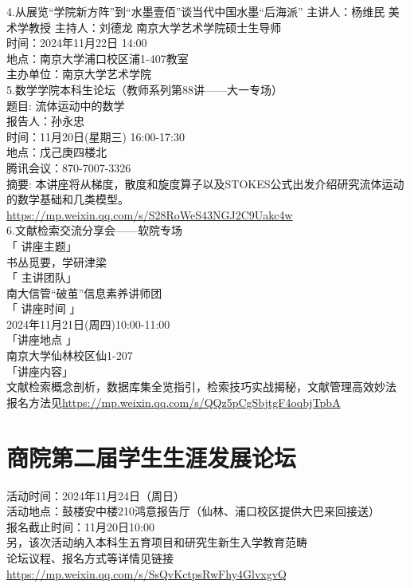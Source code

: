\documentclass[letterpaper, 12pt]{article}
\begin{document}
\begin{multicols}{2}
4.从展览“学院新方阵”到“水墨壹佰”谈当代中国水墨“后海派”
主讲人：杨维民 美术学教授 主持人：刘德龙 南京大学艺术学院硕士生导师\\
时间：2024年11月22日 14:00\\
地点：南京大学浦口校区浦1-407教室\\
主办单位：南京大学艺术学院\\

5.数学学院本科生论坛（教师系列第88讲——大一专场）\\
题目: 流体运动中的数学\\
报告人：孙永忠\\
时间：11月20日(星期三) 16:00-17:30\\
地点：戊己庚四楼北\\
腾讯会议：870-7007-3326\\
摘要: 本讲座将从梯度，散度和旋度算子以及STOKES公式出发介绍研究流体运动的数学基础和几类模型。\\
\url{https://mp.weixin.qq.com/s/S28RoWeS43NGJ2C9Uakc4w}\\

6.文献检索交流分享会——软院专场\\
「 讲座主题」\\
书丛觅要，学研津梁\\
「 主讲团队」\\
南大信管“破茧”信息素养讲师团\\
「 讲座时间 」\\
2024年11月21日(周四)10:00-11:00\\
「讲座地点 」\\
南京大学仙林校区仙1-207\\
「讲座内容」\\
文献检索概念剖析，数据库集全览指引，检索技巧实战揭秘，文献管理高效妙法\\
报名方法见\url{https://mp.weixin.qq.com/s/QQz5pCgSbjtgF4oqbjTpbA}\\
\section{商院第二届学生生涯发展论坛}
活动时间：2024年11月24日（周日）
\\活动地点：鼓楼安中楼210鸿意报告厅（仙林、浦口校区提供大巴来回接送）
\\报名截止时间：11月20日10:00
\\另，该次活动纳入本科生五育项目和研究生新生入学教育范畴
\\论坛议程、报名方式等详情见链接\url{https://mp.weixin.qq.com/s/SsQvKctpsRwFhy4GlvxgvQ}


\end{multicols}
\end{document}
